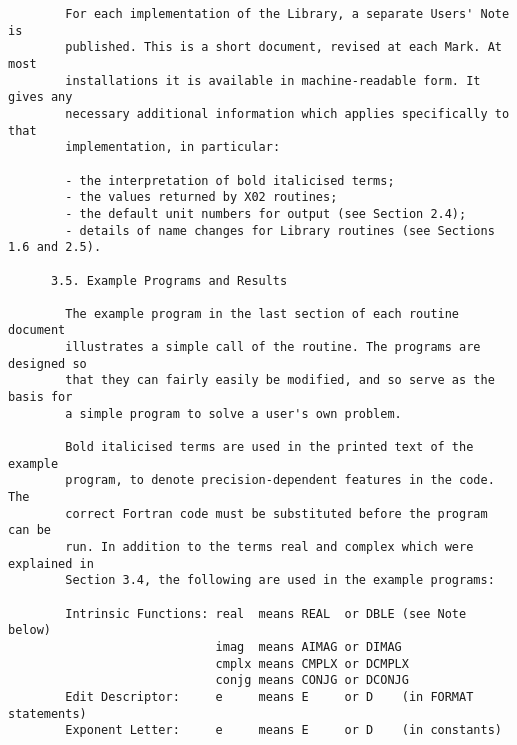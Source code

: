 \begin{small}
\begin{verbatim}
        For each implementation of the Library, a separate Users' Note is         
        published. This is a short document, revised at each Mark. At most        
        installations it is available in machine-readable form. It gives any      
        necessary additional information which applies specifically to that       
        implementation, in particular:                                            
                                                                                  
        - the interpretation of bold italicised terms;                            
        - the values returned by X02 routines;                                    
        - the default unit numbers for output (see Section 2.4);                  
        - details of name changes for Library routines (see Sections 1.6 and 2.5).
                                                                                  
      3.5. Example Programs and Results                                           
                                                                                  
        The example program in the last section of each routine document          
        illustrates a simple call of the routine. The programs are designed so    
        that they can fairly easily be modified, and so serve as the basis for    
        a simple program to solve a user's own problem.                           
                                                                                  
        Bold italicised terms are used in the printed text of the example         
        program, to denote precision-dependent features in the code. The          
        correct Fortran code must be substituted before the program can be        
        run. In addition to the terms real and complex which were explained in    
        Section 3.4, the following are used in the example programs:              
                                                                                  
        Intrinsic Functions: real  means REAL  or DBLE (see Note below)           
                             imag  means AIMAG or DIMAG                           
                             cmplx means CMPLX or DCMPLX                          
                             conjg means CONJG or DCONJG                          
        Edit Descriptor:     e     means E     or D    (in FORMAT statements)     
        Exponent Letter:     e     means E     or D    (in constants)             
                                                                                  

\end{verbatim}
\end{small}
